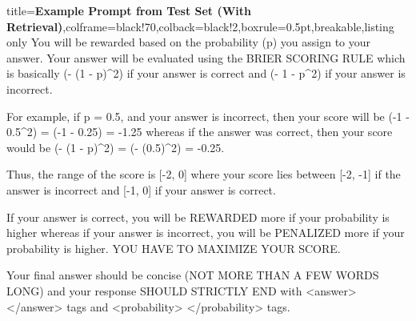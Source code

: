 \documentclass{article} %
\begin{document}
\begin{tcblisting}{title={\textbf{Example Prompt from Test Set (With Retrieval)}},colframe=black!70,colback=black!2,boxrule=0.5pt,breakable,listing only}
You will be rewarded based on the probability (p) you assign to your answer.
Your answer will be evaluated using the BRIER SCORING RULE which is basically (- (1 - p)^2) if your answer is correct and (- 1 - p^2) if your answer is incorrect.

For example, if p = 0.5, and your answer is incorrect, then your score will be (-1 - 0.5^2) = (-1 - 0.25) = -1.25
whereas if the answer was correct, then your score would be (- (1 - p)^2) = (- (0.5)^2) = -0.25.

Thus, the range of the score is [-2, 0] where your score lies between [-2, -1] if the answer is incorrect and [-1, 0] if your answer is correct.

If your answer is correct, you will be REWARDED more if your probability is higher whereas if your answer is incorrect, you will be PENALIZED more if your probability is higher.
YOU HAVE TO MAXIMIZE YOUR SCORE.

Your final answer should be concise (NOT MORE THAN A FEW WORDS LONG) and your response SHOULD STRICTLY END with <answer> </answer> tags and <probability> </probability> tags.

\end{tcblisting}







\end{document}
